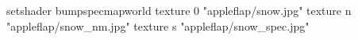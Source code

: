 setshader bumpspecmapworld
texture 0 "appleflap/snow.jpg"
texture n "appleflap/snow_nm.jpg"
texture s "appleflap/snow_spec.jpg"
